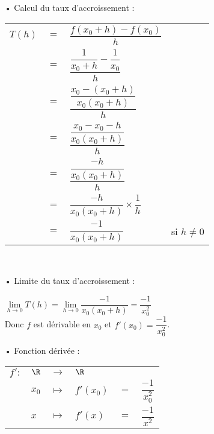 \begin{itemize}
\item[•] Calcul du taux d'accroissement : \vspace*{.3cm}
\\
\begin{tabular}{llll}
$T(h)$ & $=$ & $\dfrac{f(x_0 + h) - f(x_0)}{h}$ & \vspace*{.3cm} \\
& $=$ & $\dfrac{\dfrac{1}{x_0 + h} - \dfrac{1}{x_0}}{h}$ & \vspace*{.3cm} \\
& $=$ & $\dfrac{\dfrac{x_0-\left(x_0 + h\right)}{x_0\left(x_0 + h\right)}}{h}$ & \vspace*{.3cm} \\
& $=$ & $\dfrac{\dfrac{x_0 - x_0 - h}{x_0\left(x_0 + h\right)}}{h}$ & \vspace*{.3cm} \\
& $=$ & $\dfrac{\dfrac{-h}{x_0\left(x_0 + h\right)}}{h}$ & \vspace*{.3cm} \\
& $=$ & $\dfrac{-h}{x_0\left(x_0 + h\right)} \times \dfrac{1}{h}$ & \vspace*{.3cm} \\
& $=$ & $\dfrac{-1}{x_0\left(x_0 + h\right)}$ & si $h \neq 0$ \\
\end{tabular} \\
\vspace*{.3cm}

\item[•] Limite du taux d'accroissement : \vspace*{.3cm}

$\lim\limits_{h \to 0} T(h) = \lim\limits_{h \to 0} \dfrac{-1}{x_0\left(x_0 + h\right)} = \dfrac{-1}{x_0^2}$ \vspace*{.3cm} \\

Donc $f$ est dérivable en $x_0$ et $f'(x_0) = \dfrac{-1}{x_0^2}$. \\

\item[•] Fonction dérivée : \\

\begin{tabular}{llllll}
$f' :$ & $\R$ & $\longrightarrow$ & $\R$ & & \\
& $x_0$ & $\longmapsto$ & $f'(x_0)$ & $ = $ & $\dfrac{-1}{x_0^2}$ \vspace*{.3cm} \\
& $x$ & $\longmapsto$ & $f'(x)$ & $ = $ & $\dfrac{-1}{x^2}$ \\
\end{tabular}
\end{itemize}

